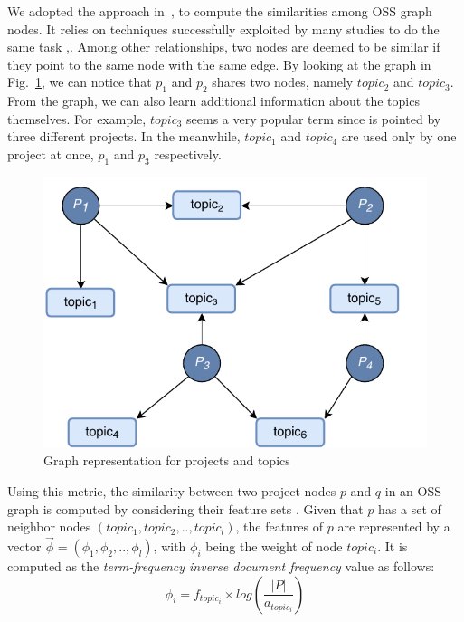 We adopted the approach in~\cite{Nguyen:2019:FRS:3339505.3339636},\cite{8498236} to compute the
similarities among OSS graph nodes. It relies on techniques successfully
exploited by many studies to do the same task
\cite{DiNoia:2012:LOD:2362499.2362501},\cite{BRIGUEZ20146467}. Among
other relationships, two nodes are deemed to be similar if they point to the same node with the same edge. By looking at the graph in
Fig.~\ref{fig:Graph}, we can notice that $p_1$ and $p_2$ shares two nodes, namely $topic_{2}$ and $topic_{3}$. From the graph, we can also learn additional information about the topics themselves. For example, $topic_{3}$ seems a very popular term since is pointed by three
different projects. In the meanwhile, $topic_1$ and $topic_4$ are used only by one project at once, $p_1$ and $p_3$ respectively. 

%

\begin{figure}[t!]
\centering
\includegraphics[width=\columnwidth]{figs/graphCFtop.pdf}
\caption{Graph representation for projects and topics}
\label{fig:Graph}
\end{figure}


Using this metric, the similarity between two project nodes $p$ and $q$ in an OSS graph is computed 
by considering their feature sets \cite{DiNoia:2012:LOD:2362499.2362501}. Given that $p$ has a 
set of neighbor nodes 
$(topic_{1},topic_{2},..,topic_{l})$, the features of $p$ are represented by a vector 
$\overrightarrow{\phi}=(\phi_{1},\phi_{2},..,\phi_{l})$, with $\phi_{i}$ being the weight of node 
$topic_{i}$. It is computed as the \emph{term-frequency inverse document frequency} value as follows: 
\begin{equation}\label{eqn:TFIDF}
\phi_{i} = f_{topic_{i}} \times log(\frac{ \left | P \right |}{a_{topic_{i}}})
\end{equation}

